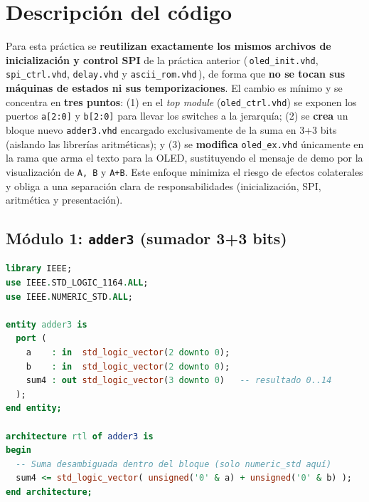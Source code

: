 \documentclass[a4paper,12pt]{article}
\begin{document}
\newpage

\section{Descripción del código}

Para esta práctica se \textbf{reutilizan exactamente los mismos archivos de inicialización y control SPI} de la práctica anterior (\,\texttt{oled\_init.vhd}, \texttt{spi\_ctrl.vhd}, \texttt{delay.vhd} y \texttt{ascii\_rom.vhd}\,), de forma que \textbf{no se tocan sus máquinas de estados ni sus temporizaciones}. El cambio es mínimo y se concentra en \textbf{tres puntos}: (1) en el \emph{top module} (\texttt{oled\_ctrl.vhd}) se exponen los puertos \texttt{a[2:0]} y \texttt{b[2:0]} para llevar los switches a la jerarquía; (2) se \textbf{crea} un bloque nuevo \texttt{adder3.vhd} encargado exclusivamente de la suma en 3+3 bits (aislando las librerías aritméticas); y (3) se \textbf{modifica} \texttt{oled\_ex.vhd} únicamente en la rama que arma el texto para la OLED, sustituyendo el mensaje de demo por la visualización de \texttt{A, B} y \texttt{A+B}. Este enfoque minimiza el riesgo de efectos colaterales y obliga a una separación clara de responsabilidades (inicialización, SPI, aritmética y presentación).

\subsection{Módulo 1: \texttt{adder3} (sumador 3+3 bits)}

\begin{lstlisting}[language=VHDL, caption={Bloque de suma aislado \texttt{adder3.vhd} (3+3 bits $\rightarrow$ 4 bits).}]
library IEEE;
use IEEE.STD_LOGIC_1164.ALL;
use IEEE.NUMERIC_STD.ALL;

entity adder3 is
  port (
    a    : in  std_logic_vector(2 downto 0);
    b    : in  std_logic_vector(2 downto 0);
    sum4 : out std_logic_vector(3 downto 0)   -- resultado 0..14
  );
end entity;

architecture rtl of adder3 is
begin
  -- Suma desambiguada dentro del bloque (solo numeric_std aquí)
  sum4 <= std_logic_vector( unsigned('0' & a) + unsigned('0' & b) );
end architecture;
\end{lstlisting}
\end{document}
